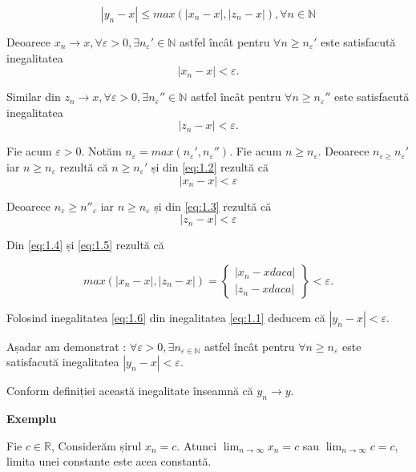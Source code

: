 \documentclass[a4paper,12pt,oneside]{report}
\begin{document}
\[\left | y_{n} - x \right |\leq max (\left | x_{n}-x \right |, \left | z_{n} - x \right |),\forall n\in \mathbb{N} \tag{1.1}\label{eq:1.1}\]


Deoarece \(x_{n} \to x, \forall \varepsilon > 0, \exists {n_{\varepsilon }}'\in \mathbb{N}\) astfel încât pentru \(\forall n \geq {n_{\varepsilon }}'\) este satisfacută inegalitatea \[\left | x_{n}-x \right |< \varepsilon.\tag{1.2}\label{eq:1.2} \]
	
Similar din \(z_{n} \to x, \forall \varepsilon > 0,\exists {n_{\varepsilon }}'' \in \mathbb{N}\) astfel încât pentru \(\forall n\geq {n_{\varepsilon }}''\) este satisfacută inegalitatea \[\left | z_{n} -x \right |< \varepsilon. \tag{1.3}\label{eq:1.3}\]

Fie acum \(\varepsilon > 0.\) Notăm \(n_{\varepsilon } = max ({n_{\varepsilon }}', {n_{\varepsilon }}'')\). Fie acum \(n\geq n_{\varepsilon }\). Deoarece \(n_{\varepsilon \geq }{n_{\varepsilon }}'\) iar \(n\geq n_{\varepsilon }\) rezultă că \(n\geq {n_{\varepsilon }}'\) și din \eqref{eq:1.2} rezultă că \[\left | x_{n} - x \right |< \varepsilon \tag{1.4}\label{eq:1.4} \]
	
Deoarece \(n_{\varepsilon }\geq {n}''_{\varepsilon }\) iar \(n\geq n_{\varepsilon}\) și din \eqref{eq:1.3} rezultă că  \[\left | z_{n}-x  \right |< \varepsilon \tag{1.5}\label{eq:1.5}\]
	
Din \eqref{eq:1.4} și \eqref{eq:1.5} rezultă că

\[ max(\left | x_{n} -x  \right |, \left | z_{n}-x \right |) = \begin{Bmatrix}
\left | x_{n}-x daca  \right |\\ 
\left | z_{n}-x daca  \right |
\end{Bmatrix} < \varepsilon.  \tag{1.6}\label{eq:1.6} \]

Folosind inegalitatea \eqref{eq:1.6} din inegalitatea \eqref{eq:1.1} deducem că \(\left | y_{n}-x  \right |< \varepsilon\).
 
Așadar am demonstrat : \(\forall \varepsilon > 0, \exists n_{\varepsilon \in \mathbb{N}}\) astfel încât pentru \(\forall n\geq n_{\varepsilon }\) este satisfacută inegalitatea \(\left | y_{n}-x \right |< \varepsilon.\) 

Conform definiției această inegalitate înseamnă că \(y_{n} \to y.\) 

\textbf{Exemplu}

Fie \(c \in \mathbb{R}\), Considerăm șirul \(x_{n}=c\). Atunci \(\lim_{n \to \infty }x_{n}=c\) sau \(\lim_{n \to \infty }c=c\), limita unei constante este acea constantă. 
\end{document}
